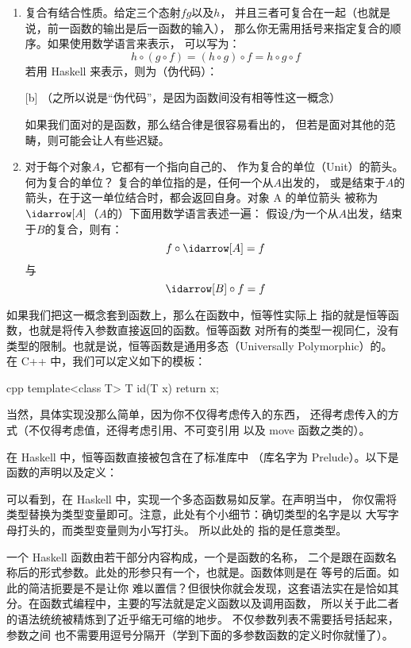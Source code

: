 \begin{enumerate}
  \item
        复合有结合性质。给定三个态射$f$$g$以及$h$，
        并且三者可复合在一起（也就是说，前一函数的输出是后一函数的输入），
        那么你无需用括号来指定复合的顺序。如果使用数学语言来表示，
        可以写为：
        \[h \circ (g \circ f) = (h \circ g) \circ f = h \circ g \circ f\]
        若用 Haskell 来表示，则为（伪代码）：

        [b]
        （之所以说是“伪代码”，是因为函数间没有相等性这一概念）

        如果我们面对的是函数，那么结合律是很容易看出的，
        但若是面对其他的范畴，则可能会让人有些迟疑。

  \item
        对于每个对象$A$，它都有一个指向自己的、
        作为复合的单位（Unit）的箭头。何为复合的单位？
        复合的单位指的是，任何一个从$A$出发的，
        或是结束于$A$的箭头，在于这一单位结合时，都会返回自身。对象 A 的单位箭头
        被称为$\idarrow[A]$（$A$的）下面用数学语言表述一遍：
        假设$f$为一个从$A$出发，结束于$B$的复合，则有：
        \[f \circ \idarrow[A] = f\]
        与
        \[\idarrow[B] \circ f = f\]
\end{enumerate}
如果我们把这一概念套到函数上，那么在函数中，恒等性实际上
指的就是恒等函数，也就是将传入参数直接返回的函数。恒等函数
对所有的类型一视同仁，没有类型的限制。也就是说，恒等函数是通用多态（Universally Polymorphic）的。
在 C++ 中，我们可以定义如下的模板：

\begin{snip}{cpp}
template<class T> T id(T x) { return x; }
\end{snip}
当然，具体实现没那么简单，因为你不仅得考虑传入的东西，
还得考虑传入的方式（不仅得考虑值，还得考虑引用、不可变引用
以及 move 函数之类的）。

在 Haskell 中，恒等函数直接被包含在了标准库中
（库名字为 Prelude）。以下是函数的声明以及定义：

可以看到，在 Haskell 中，实现一个多态函数易如反掌。在声明当中，
你仅需将类型替换为类型变量即可。注意，此处有个小细节：确切类型的名字是以
大写字母打头的，而类型变量则为小写打头。
所以此处的
  指的是任意类型。

一个 Haskell 函数由若干部分内容构成，一个是函数的名称， 
二个是跟在函数名称后的形式参数。此处的形参只有一个，也就是。函数体则是在
等号的后面。如此的简洁扼要是不是让你
难以置信？但很快你就会发现，这套语法实在是恰如其分。在函数式编程中，主要的写法就是定义函数以及调用函数，
所以关于此二者的语法统统被精炼到了近乎缩无可缩的地步。
不仅参数列表不需要括号括起来，参数之间
也不需要用逗号分隔开（学到下面的多参数函数的定义时你就懂了）。




